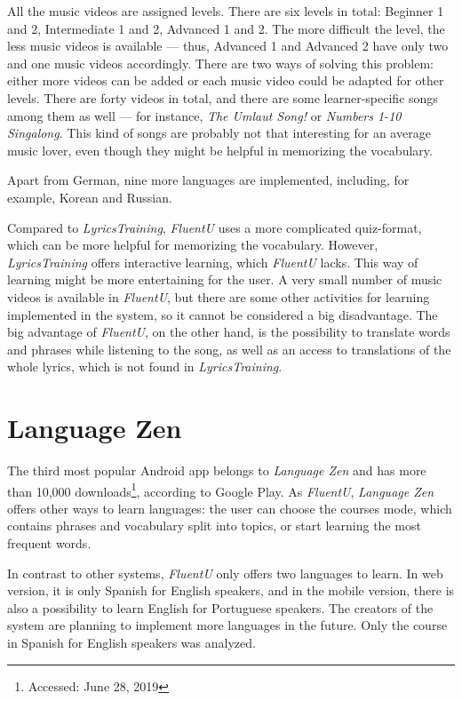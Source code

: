 All the music videos are assigned levels. There are six levels in total: Beginner 1 and 2, Intermediate 1 and 2, Advanced 1 and 2. The more difficult the level, the less music videos is available --- thus, Advanced 1 and Advanced 2 have only two and one music videos accordingly. There are two ways of solving this problem: either more videos can be added or each music video could be adapted for other levels. There are forty videos in total, and there are some learner-specific songs among them as well --- for instance, \textit{The Umlaut Song!} or \textit{Numbers 1-10 Singalong}. This kind of songs are probably not that interesting for an average music lover, even though they might be helpful in memorizing the vocabulary.

Apart from German, nine more languages are implemented, including, for example, Korean and Russian.

Compared to \textit{LyricsTraining}, \textit{FluentU} uses a more complicated quiz-format, which can be more helpful for memorizing the vocabulary. However, \textit{LyricsTraining} offers interactive learning, which \textit{FluentU} lacks. This way of learning might be more entertaining for the user. A very small number of music videos is available in \textit{FluentU}, but there are some other activities for learning implemented in the system, so it cannot be considered a big disadvantage.  
The big advantage of \textit{FluentU}, on the other hand, is the possibility to translate words and phrases while listening to the song, as well as an access to translations of the whole lyrics, which is not found in \textit{LyricsTraining}.

\section{Language Zen}

The third most popular Android app belongs to \textit{Language Zen} and has more than 10,000 downloads\footnote{Accessed: June 28, 2019}, according to Google Play. As \textit{FluentU}, \textit{Language Zen} offers other ways to learn languages: the user can choose the courses mode, which contains phrases and vocabulary split into topics, or start learning the most frequent words. 

In contrast to other systems, \textit{FluentU} only offers two languages to learn. In web version, it is only Spanish for English speakers, and in the mobile version, there is also a possibility to learn English for Portuguese speakers. The creators of the system are planning to implement more languages in the future. Only the course in Spanish for English speakers was analyzed. 

